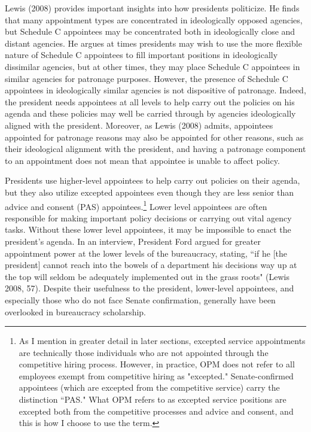 \documentclass[12pt]{article}
\begin{document}
Lewis (2008) provides important insights into how presidents politicize. He finds that many appointment types are concentrated in ideologically opposed agencies, but Schedule C appointees may be concentrated both in ideologically close and distant agencies. He argues at times presidents may wish to use the more flexible nature of Schedule C appointees to fill important positions in ideologically dissimilar agencies, but at other times, they may place Schedule C appointees in similar agencies for patronage purposes. However, the presence of Schedule C appointees in ideologically similar agencies is not dispositive of patronage. Indeed, the president needs appointees at all levels to help carry out the policies on his agenda and these policies may well be carried through by agencies ideologically aligned with the president. Moreover, as Lewis (2008) admits, appointees appointed for patronage reasons may also be appointed for other reasons, such as their ideological alignment with the president, and having a patronage component to an appointment does not mean that appointee is unable to affect policy. 

Presidents use higher-level appointees to help carry out policies on their agenda, but they also utilize excepted appointees even though they are less senior than advice and consent (PAS) appointees.\footnote{As I mention in greater detail in later sections, excepted service appointments are technically those individuals who are not appointed through the competitive hiring process. However, in practice, OPM does not refer to all employees exempt from competitive hiring as "excepted." Senate-confirmed appointees (which are excepted from the competitive service) carry the distinction ``PAS." What OPM refers to as excepted service positions are excepted both from the competitive processes and advice and consent, and this is how I choose to use the term.} Lower level appointees are often responsible for making important policy decisions or carrying out vital agency tasks. Without these lower level appointees, it may be impossible to enact the president's agenda. In an interview, President Ford argued for greater appointment power at the lower levels of the bureaucracy, stating, ``if he [the president] cannot reach into the bowels of a department his decisions way up at the top will seldom be adequately implemented out in the grass roots" (Lewis 2008, 57). Despite their usefulness to the president, lower-level appointees, and especially those who do not face Senate confirmation, generally have been overlooked in bureaucracy scholarship.
\end{document}
